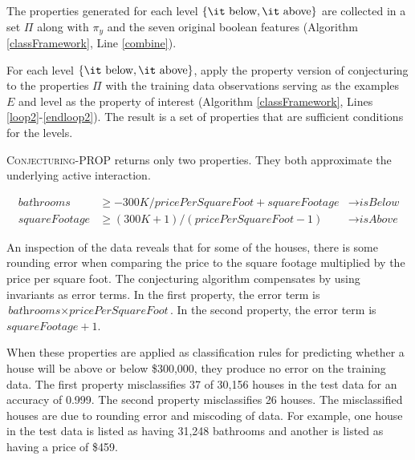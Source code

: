 \documentclass[ijds,nonblindrev]{informs-ijds}
\begin{document}

The properties generated for each level $\{\textrm{\it below}, \textrm{\it above}\}$ are collected in a set $\Pi$ along with $\pi_y$ and the seven original boolean features (Algorithm  \ref{classFramework}, Line \ref{combine}). 

For each level $\{\textrm{\it below}, \textrm{\it above}\}$, apply the property version of conjecturing to the properties $\Pi$ with the training data observations serving as the examples $E$ and level as the property of interest (Algorithm \ref{classFramework}, Lines \ref{loop2}-\ref{endloop2}).  The result is a set of properties that are sufficient conditions for the levels.

\textsc{Conjecturing-PROP} returns only two properties.  They both approximate the underlying active interaction.

\begin{align}
\textit{bathrooms} & \geq -\textit{300K}/\textit{pricePerSquareFoot} + \textit{squareFootage} & \rightarrow \textit{isBelow}\\
\textit{squareFootage} & \geq (\textit{300K}+1)/(\textit{pricePerSquareFoot}-1) & \rightarrow \textit{isAbove}
\end{align}

An inspection of the data reveals that for some of the houses, there is some rounding error when comparing the price to the square footage multiplied by the price per square foot.  The conjecturing algorithm compensates by using invariants as error terms.  In the first property, the error term is $\textit{bathrooms}\times\textit{pricePerSquareFoot}$.  In the second property, the error term is $\textit{squareFootage} + 1$.

When these properties are applied as classification rules for predicting whether a house will be above or below \$300,000, they produce no error on the training data.  The first property misclassifies 37 of 30,156 houses in the test data for an accuracy of 0.999.  The second property misclassifies 26 houses.  The misclassified houses are due to rounding error and miscoding of data.  For example, one house in the test data is listed as having 31,248 bathrooms and another is listed as having a price of \$459.
\end{document}
